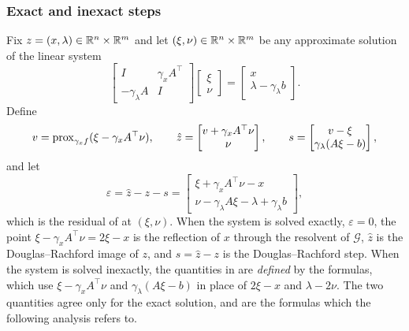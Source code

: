 \documentclass[11pt]{article}
\begin{document}
\subsubsection{Exact and inexact steps}
Fix $z = (x, \lambda) \in \mathbb{R}^n \times \mathbb{R}^m$ and let $(\xi, \nu) \in \mathbb{R}^n \times \mathbb{R}^m$ be any approximate solution of the linear system
\begin{equation}\label{eq:linear-system-step}
    \begin{bmatrix}
        I & \gamma_x A^\top \\ -\gamma_\lambda A & I
    \end{bmatrix}\begin{bmatrix}
        \xi \\ \nu
    \end{bmatrix} = \begin{bmatrix}
        x \\ \lambda - \gamma_\lambda b
    \end{bmatrix}.
\end{equation}
Define
\begin{equation}\label{eq:true-step-definitions}
    v = \mathrm{prox}_{\gamma_x f}(\xi - \gamma_x A^\top \nu), \qquad
    \hat{z} = \begin{bmatrix} v + \gamma_x A^\top \nu \\ \nu \end{bmatrix}, \qquad
    s = \begin{bmatrix} v - \xi \\ \gamma_\lambda (A\xi - b) \end{bmatrix},
\end{equation}
and let
\begin{equation}\label{eq:residual-definition}
    \varepsilon = \hat{z} - z - s = \begin{bmatrix} \xi + \gamma_x A^\top \nu - x \\ \nu - \gamma_\lambda A\xi - \lambda + \gamma_\lambda b \end{bmatrix},
\end{equation}
which is the residual of  at $(\xi, \nu)$.
When the system is solved exactly, $\varepsilon = 0$, the point $\xi - \gamma_x A^\top\nu = 2\xi - x$ is the reflection of $x$ through the resolvent of $\mathcal{G}$, $\hat z$ is the Douglas--Rachford image of $z$, and $s = \hat z - z$ is the Douglas--Rachford step.
When the system is solved inexactly, the quantities in  are \emph{defined} by the formulas, which use $\xi - \gamma_x A^\top \nu$ and $\gamma_\lambda(A\xi - b)$ in place of $2\xi - x$ and $\lambda - 2\nu$.
The two quantities agree only for the exact solution, and are the formulas which the following analysis refers to.
\end{document}
